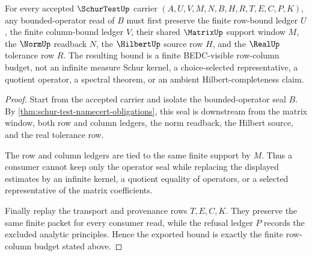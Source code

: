 \begin{theorem}
\label{thm:schur-test-finite-row-column-bound}
For every accepted $\SchurTestUp$ carrier $(A,U,V,M,N,B,H,R,T,E,C,P,K)$, any bounded-operator read of $B$ must first preserve the finite row-bound ledger $U$, the finite column-bound ledger $V$, their shared $\MatrixUp$ support window $M$, the $\NormUp$ readback $N$, the $\HilbertUp$ source row $H$, and the $\RealUp$ tolerance row $R$. The resulting bound is a finite BEDC-visible row-column budget, not an infinite measure Schur kernel, a choice-selected representative, a quotient operator, a spectral theorem, or an ambient Hilbert-completeness claim.
\end{theorem}
\begin{proof}
Start from the accepted carrier and isolate the bounded-operator seal $B$. By \autoref{thm:schur-test-namecert-obligations}, this seal is downstream from the matrix window, both row and column ledgers, the norm readback, the Hilbert source, and the real tolerance row.

The row and column ledgers are tied to the same finite support by $M$. Thus a consumer cannot keep only the operator seal while replacing the displayed estimates by an infinite kernel, a quotient equality of operators, or a selected representative of the matrix coefficients.

Finally replay the transport and provenance rows $T,E,C,K$. They preserve the same finite packet for every consumer read, while the refusal ledger $P$ records the excluded analytic principles. Hence the exported bound is exactly the finite row-column budget stated above.
\end{proof}


\begin{closurestatus}{\SchurTestUp}
  \theoryclosure{\seedClosure}
  \formalstatus{\unformalizedV}
\end{closurestatus}
